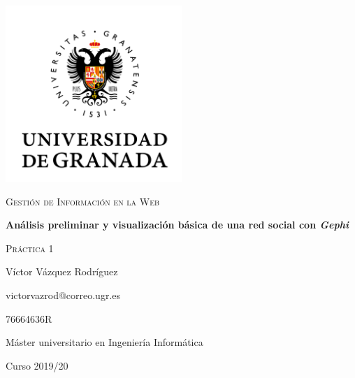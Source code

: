 \documentclass{article}
\begin{document}
\begin{titlepage}
    \centering
    \includegraphics[width=0.5\textwidth]{images/logo-ugr.png}\par
    \vspace{1cm}
    {\Large\scshape Gestión de Información en la Web \par}
    {\huge\bfseries Análisis preliminar y visualización básica de una red social
    con \textit{Gephi} \par}
    \vspace{0.2cm}
    {\scshape Práctica 1 \par}
    \vfill
    {\large Víctor Vázquez Rodríguez  \par}
    {victorvazrod@correo.ugr.es \par}
    {76664636R \par}
    \vfill
    {\large Máster universitario en Ingeniería Informática \par}
    \vspace{0.2cm}
    {Curso 2019/20 \par}
\end{titlepage}

\tableofcontents\newpage

\newpage
\newpage



\end{document}
